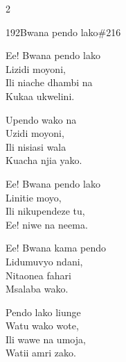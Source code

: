 \begin{multicols}{2}
\begin{hymn}{192}{Bwana pendo lako}{\#216}
\begin{stanza}
Ee! Bwana pendo lako\\
Lizidi moyoni,\\
Ili niache dhambi na\\
Kukaa ukwelini.
\end{stanza}
\begin{chorus}
Upendo wako na\\
Uzidi moyoni,\\
Ili nisiasi wala\\
Kuacha njia yako.
\end{chorus}
\begin{stanza}
Ee! Bwana pendo lako\\
Linitie moyo,\\
Ili nikupendeze tu,\\
Ee! niwe na neema.
\end{stanza}
\begin{stanza}
Ee! Bwana kama pendo\\
Lidumuvyo ndani,\\
Nitaonea fahari\\
Msalaba wako.
\end{stanza}
\begin{stanza}
Pendo lako liunge\\
Watu wako wote,\\
Ili wawe na umoja,\\
Watii amri zako.
\end{stanza}
\end{hymn}


\end{multicols}

